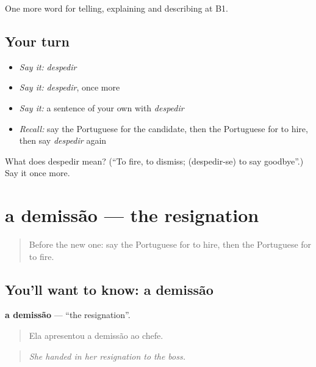 \begin{grammarlens}[title={What you've built}]
One more word for telling, explaining and describing at B1.
\end{grammarlens}

\subsection*{Your turn}
\begin{itemize}
\raggedright
  \item \emph{Say it:} \emph{despedir}
  \item \emph{Say it:} \emph{despedir}, once more
  \item \emph{Say it:} a sentence of your own with \emph{despedir}
  \item \emph{Recall:} say the Portuguese for the candidate, then the Portuguese for to hire, then say \emph{despedir} again
\end{itemize}

\begin{tcolorbox}[breakable,colback=teal!4,colframe=teal!35!black,title={Before you move on}]
What does despedir mean? (\textquotedblleft{}To fire, to dismiss; (despedir-se) to say goodbye\textquotedblright{}.) Say it once more.
\end{tcolorbox}
\section[a demissão]{a demissão — the resignation}

\label{lesson:PT-C356-demissao}



\begin{quote}
Before the new one: say the Portuguese for to hire, then the Portuguese for to fire.
\end{quote}

\subsection*{You'll want to know: a demissão}
\textbf{a demissão} — \textquotedblleft{}the resignation\textquotedblright{}.

\begin{quote}
Ela apresentou a demissão ao chefe.
\end{quote}

\begin{quote}
\emph{She handed in her resignation to the boss.}
\end{quote}

